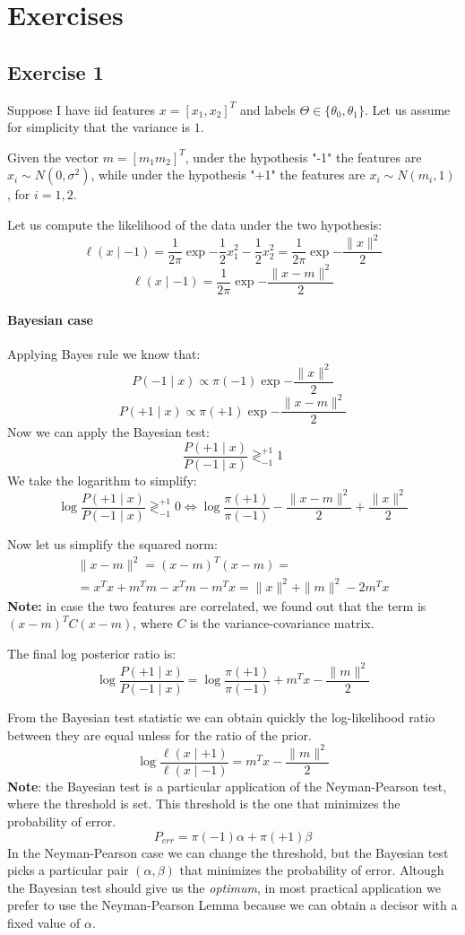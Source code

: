 \section{Exercises}
\subsection{Exercise 1}
Suppose I have iid features $x = [x_1, x_2]^T$ and labels $\Theta \in \{\theta_0, \theta_1\}$. Let us assume for simplicity that the variance is $1$.

Given the vector $m = [m_1 m_2]^T$, under the hypothesis "-1" the features are $x_i \sim N(0, \sigma^2)$, while under the hypothesis "+1" the features are $x_i \sim N(m_i, 1)$, for $i=1,2$.

Let us compute the likelihood of the data under the two hypothesis:
\[
    \ell(x \mid -1 ) = \frac{1}{2\pi} \exp{-\frac{1}{2} x_1^2 - \frac{1}{2} x_2^2 } = \frac{1}{2\pi} \exp{- \frac{\|x\|^2}{2}}
\]
\[
    \ell(x \mid -1 ) = \frac{1}{2\pi} \exp{- \frac{\|x-m\|^2}{2}}
\]
\paragraph*{Bayesian case}
Applying Bayes rule we know that:
\[
    P(-1 \mid x) \propto \pi(-1) \exp{- \frac{\|x\|^2}{2}}
\]
\[
    P(+1 \mid x) \propto \pi(+1) \exp{- \frac{\|x-m\|^2}{2}}
\]
Now we can apply the Bayesian test:
\[
    \frac{P(+1 \mid x)}{P(-1 \mid x)} \gtrless^{+1}_{-1} 1
\]
We take the logarithm to simplify:
\[
    \log \frac{P(+1 \mid x)}{P(-1 \mid x)} \gtrless^{+1}_{-1} 0 \Leftrightarrow \log\frac{\pi(+1)}{\pi(-1)} -  \frac{\|x-m\|^2}{2} + \frac{\|x\|^2}{2}
\]

Now let us simplify the squared norm:
\begin{align*}
    \|x-m\|^2 = (x-m)^T (x-m) = \\
    = x^T x + m^T m - x^T m - m^T x = \|x\|^2 + \|m\|^2 - 2m^T x
\end{align*}
\textbf{Note:} in case the two features are correlated, we found out that the term is $(x-m)^T C (x-m)$, where $C$ is the variance-covariance matrix.

The final log posterior ratio is:
\[
    \log \frac{P(+1 \mid x)}{P(-1 \mid x)} = \log\frac{\pi(+1)}{\pi(-1)} + m^T x - \frac{\|m\|^2}{2}
\]


From the Bayesian test statistic we can obtain quickly the log-likelihood ratio between they are equal unless for the ratio of the prior.
\[
    \log \frac{\ell(x \mid +1)}{\ell(x \mid -1)} = m^T x - \frac{\|m\|^2}{2}
\]
\textbf{Note}: the Bayesian test is a particular application of the Neyman-Pearson test, where the threshold is set. This threshold is the one that minimizes the probability of error.
\[
    P_{err} = \pi(-1) \alpha + \pi(+1)\beta
\]
In the Neyman-Pearson case we can change the threshold, but the Bayesian test picks a particular pair $(\alpha, \beta)$ that minimizes the probability of error. Altough the Bayesian test should give us the \textit{optimum}, in most practical application we prefer to use the Neyman-Pearson Lemma because we can obtain a decisor with a fixed value of $\alpha$.

